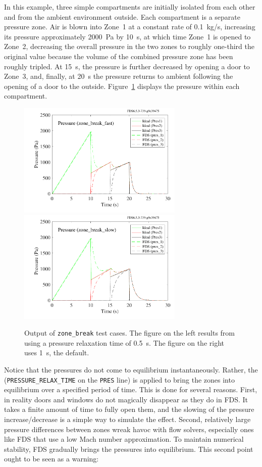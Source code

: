 \documentclass[11pt]{book}
\newcommand{\ct}{\tt\small}
\begin{document}
In this example, three simple compartments are initially isolated from each other and from the ambient environment outside. Each compartment is a separate pressure zone. Air
is blown into Zone~1 at a constant rate of 0.1~kg/s, increasing its pressure approximately 2000~Pa by 10~s, at which time Zone~1 is opened to Zone~2, decreasing the
overall pressure in the two zones to roughly one-third the original value because the volume of the combined pressure zone has been roughly tripled.
At 15~s, the pressure is further decreased by opening a door to Zone~3, and, finally, at 20~s the pressure returns to ambient following the opening
of a door to the outside. Figure~\ref{zone_break} displays the pressure within each compartment.
\begin{figure}[ht]
\includegraphics[width=3.1in]{SCRIPT_FIGURES/zone_break_fast}
\includegraphics[width=3.1in]{SCRIPT_FIGURES/zone_break_slow}
\caption[Results of the {\ct zone\_break} test cases]{Output of {\ct zone\_break} test cases. The figure on the left results from using a pressure relaxation time of 0.5~s. The
figure on the right uses 1~s, the default.}
\label{zone_break}
\end{figure}
Notice that the pressures do not come to equilibrium instantaneously. Rather, the ({\ct PRESSURE\_RELAX\_TIME} on the {\ct PRES} line) is applied to bring the zones
into equilibrium over a specified period of time. This is done for several reasons. First, in reality doors and windows do not magically disappear as they do in FDS. It takes
a finite amount of time to fully open them, and the slowing of the pressure increase/decrease is a simple way to simulate the effect.
Second, relatively large pressure differences between zones wreak havoc with flow solvers, especially ones like FDS that
use a low Mach number approximation. To maintain numerical stability, FDS gradually brings the pressures into equilibrium. This second point ought to be seen as a warning:
\end{document}
